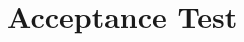 \documentclass[a4paper,bibtotoc,oneside]{scrbook}
\begin{document}
% 

%



\chapter{Acceptance Test}



%
%

\end{document}
